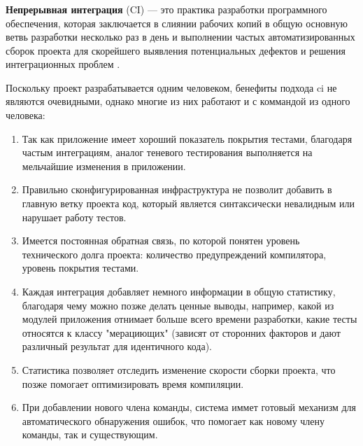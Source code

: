 \subsubsection{}
\label{sec:testing:ci:ci}

\textbf{Непрерывная интеграция} (\gls{CI}) — это практика разработки программного обеспечения, которая заключается в слиянии рабочих копий в общую основную ветвь разработки несколько раз в день и выполнении частых автоматизированных сборок проекта для скорейшего выявления потенциальных дефектов и решения интеграционных проблем \cite{wiki:ci}. 

Поскольку проект разрабатывается одним человеком, бенефиты подхода \gls{ci} не являются очевидными, однако многие из них работают и с коммандой из одного человека:

\begin{enumerate}
	\item Так как приложение имеет хороший показатель покрытия тестами, благодаря частым интеграциям, аналог теневого тестирования выполняется на мельчайшие изменения в приложении.
	\item Правильно сконфигурированная инфраструктура не позволит добавить в главную ветку проекта код, который является синтаксически невалидным или нарушает работу тестов.
	\item Имеется постоянная обратная связь, по которой понятен уровень технического долга проекта: количество предупреждений компилятора, уровень покрытия тестами.
	\item Каждая интеграция добавляет немного информации в общую статистику, благодаря чему можно позже делать ценные выводы, например, какой из модулей приложения отнимает больше всего времени разработки, какие тесты относятся к классу "мерациющих" (зависят от сторонних факторов и дают различный результат для идентичного кода).
	\item Статистика позволяет отследить изменение скорости сборки проекта, что позже помогает оптимизировать время компиляции.
	\item При добавлении нового члена команды, система иммет готовый механизм для автоматического обнаружения ошибок, что помогает как новому члену команды, так и существующим.
\end{enumerate}